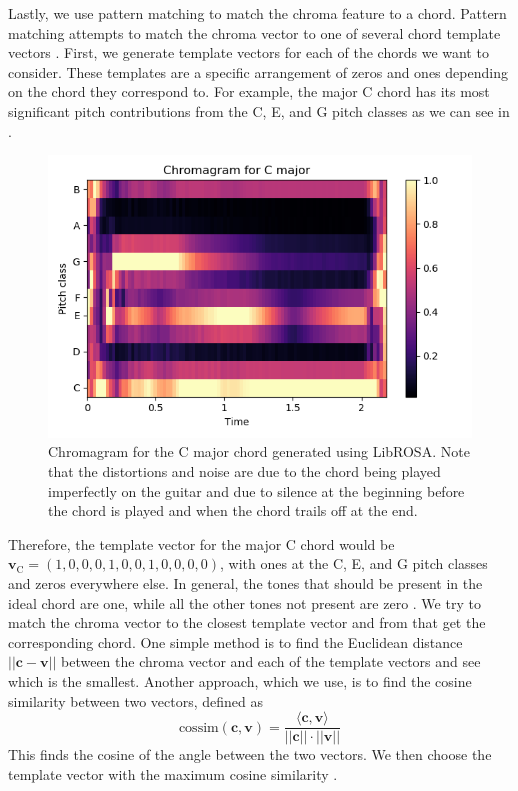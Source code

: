 \documentclass[journal]{IEEEtran}
\begin{document}
Lastly, we use pattern matching to match the chroma feature to a chord.
Pattern matching attempts to match the chroma vector to one of several chord template vectors \cite{fujishima}.
First, we generate template vectors for each of the chords we want to consider.
These templates are a specific arrangement of zeros and ones depending on the chord they correspond to.
For example, the major C chord has its most significant pitch contributions from the C, E, and G pitch classes as we can see in .
\begin{figure}[t]
    \centering
    \includegraphics[width = \linewidth]{../Figures/chromagram_c_major}
    \caption{Chromagram for the C major chord generated using LibROSA.
    Note that the distortions and noise are due to the chord being played imperfectly on the guitar and due to silence at the beginning before the chord is played and when the chord trails off at the end.}
    \label{fig:chroma}
\end{figure}
Therefore, the template vector for the major C chord would be $\mathbf{v}_{\text{C}} = (1, 0, 0, 0, 1, 0, 0, 1, 0, 0, 0, 0)$, with ones at the C, E, and G pitch classes and zeros everywhere else.
In general, the tones that should be present in the ideal chord are one, while all the other tones not present are zero \cite{cho_chroma}.  
We try to match the chroma vector to the closest template vector and from that get the corresponding chord.
One simple method is to find the Euclidean distance $||\mathbf{c} - \mathbf{v}||$ between the chroma vector and each of the template vectors and see which is the smallest.
Another approach, which we use, is to find the cosine similarity between two vectors, defined as 
\begin{equation}
    \text{cossim}(\mathbf{c}, \mathbf{v}) = \frac{\langle\mathbf{c}, \mathbf{v}\rangle}{||\mathbf{c}|| \cdot ||\mathbf{v}||}
    \label{eq:cossim}
\end{equation}
This finds the cosine of the angle between the two vectors. 
We then choose the template vector with the maximum cosine similarity \cite{jiang}.
\end{document}
